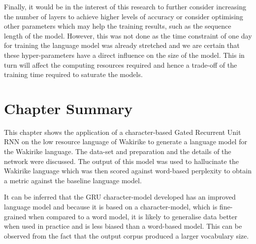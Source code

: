 Finally, it would be in the interest of this research to further consider increasing the number of layers to achieve higher levels of accuracy or consider optimising other parameters which may help the training results, such as the sequence length of the model.  However, this was not done as the time constraint of one day for training the language model was already stretched and we are certain that these hyper-parameters have a direct influence on the size of the model.  This in turn will affect the computing resources required and hence a trade-off of the training time required to saturate the models.

\stopblue

\section{Chapter Summary}
This chapter shows the application of a character-based Gated Recurrent Unit RNN on the low resource language of Wakirike to generate a language model for the Wakirike language.  The data-set and preparation and the details of the network were discussed.  The output of this model was used to hallucinate the Wakirike language which was then scored against word-based perplexity to obtain a metric against the baseline language model.

It can be inferred that the GRU character-model developed has an improved language model and because it is based on a character-model, which is fine-grained when compared to a word model, it is likely to generalise data better when used in practice and is less biased than a word-based model.  This can be observed from the fact that the output corpus produced a larger vocabulary size.
